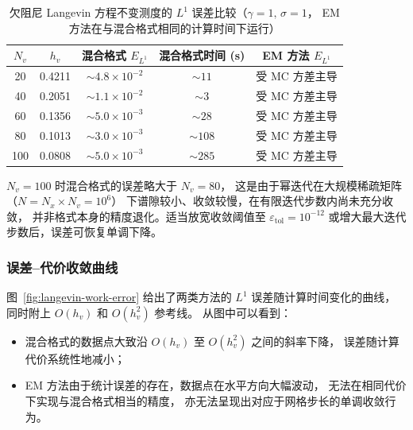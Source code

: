 	\begin{table}[htbp]
		\centering
		\caption{欠阻尼 Langevin 方程不变测度的 $L^1$ 误差比较（$\gamma=1,\,\sigma=1$，
			EM 方法在与混合格式相同的计算时间下运行）}
		\label{tab:langevin-l1}
		\begin{tabular}{ccccc}
			\toprule
			$N_v$ & $h_v$ &
			混合格式 $E_{L^1}$ & 混合格式时间 (s) &
			EM 方法 $E_{L^1}$ \\
			\midrule
			20  & 0.4211 & $\sim 4.8\times10^{-2}$ & $\sim 11$ & 受 MC 方差主导 \\
			40  & 0.2051 & $\sim 1.1\times10^{-2}$ & $\sim  3$ & 受 MC 方差主导 \\
			60  & 0.1356 & $\sim 5.0\times10^{-3}$ & $\sim 28$ & 受 MC 方差主导 \\
			80  & 0.1013 & $\sim 3.0\times10^{-3}$ & $\sim108$ & 受 MC 方差主导 \\
			100 & 0.0808 & $\sim 5.0\times10^{-3}$ & $\sim285$ & 受 MC 方差主导 \\
			\bottomrule
		\end{tabular}
	\end{table}
	
	\begin{remark}
		$N_v = 100$ 时混合格式的误差略大于 $N_v = 80$，
		这是由于幂迭代在大规模稀疏矩阵（$N = N_x \times N_v = 10^6$）
		下谱隙较小、收敛较慢，在有限迭代步数内尚未充分收敛，
		并非格式本身的精度退化。适当放宽收敛阈值至 $\varepsilon_{\mathrm{tol}} = 10^{-12}$
		或增大最大迭代步数后，误差可恢复单调下降。
	\end{remark}
	
	\subsubsection{误差--代价收敛曲线}
	
	图~\ref{fig:langevin-work-error} 给出了两类方法的 $L^1$ 误差随计算时间变化的曲线，
	同时附上 $O(h_v)$ 和 $O(h_v^2)$ 参考线。
	从图中可以看到：
	
	\begin{itemize}
		\item 混合格式的数据点大致沿 $O(h_v)$ 至 $O(h_v^2)$ 之间的斜率下降，
		误差随计算代价系统性地减小；
		\item EM 方法由于统计误差的存在，数据点在水平方向大幅波动，
		无法在相同代价下实现与混合格式相当的精度，
		亦无法呈现出对应于网格步长的单调收敛行为。
	\end{itemize}
	
	
